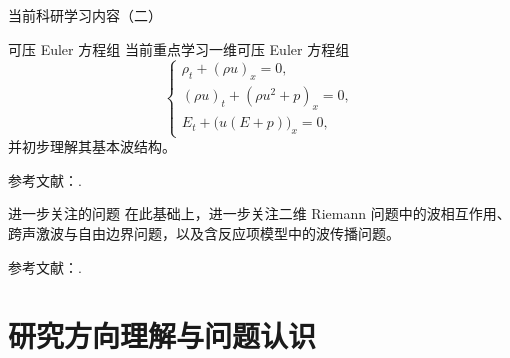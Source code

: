 \documentclass{beamer}
\begin{document}
\begin{frame}[t, shrink=5]{当前科研学习内容（二）}
\small

\begin{block}{可压 Euler 方程组}
当前重点学习一维可压 Euler 方程组
\[
\begin{cases}
\rho_t+(\rho u)_x=0,\\
(\rho u)_t+(\rho u^2+p)_x=0,\\
E_t+\bigl(u(E+p)\bigr)_x=0,
\end{cases}
\]
并初步理解其基本波结构。

\vspace{0.3em}
{\scriptsize 参考文献：\cite{ChangHsiao1989,Toro2009}.}
\end{block}

\begin{block}{进一步关注的问题}
在此基础上，进一步关注二维 Riemann 问题中的波相互作用、
跨声激波与自由边界问题，以及含反应项模型中的波传播问题。

\vspace{0.3em}
{\scriptsize 参考文献：\cite{ZhangZheng1990,ChangChenYang1995,ChangChenYang2000,ChenFeldman2003,ChenFeldman2018,Smoller1994}.}
\end{block}

\end{frame}

















\section{研究方向理解与问题认识}
\end{document}
